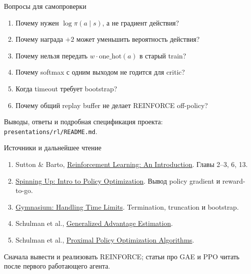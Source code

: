 \documentclass[aspectratio=169]{beamer}
\begin{document}
\begin{frame}{Вопросы для самопроверки}
  \begin{enumerate}
    \item Почему нужен $\log\pi(a\mid s)$, а не градиент действия?
    \item Почему награда $+2$ может уменьшить вероятность действия?
    \item Почему нельзя передать $w\cdot\mathrm{one\_hot}(a)$ в старый train?
    \item Почему softmax с одним выходом не годится для critic?
    \item Когда timeout требует bootstrap?
    \item Почему общий replay buffer не делает REINFORCE off-policy?
  \end{enumerate}
  Выводы, ответы и подробная спецификация проекта:
  \texttt{presentations/rl/README.md}.
\end{frame}

\begin{frame}{Источники и дальнейшее чтение}
  \small
  \begin{enumerate}
    \item Sutton \& Barto,
      \href{http://incompleteideas.net/book/the-book-2nd.html}
      {Reinforcement Learning: An Introduction}.
      Главы 2--3, 6, 13.
    \item \href{https://spinningup.openai.com/en/latest/spinningup/rl_intro3.html}
      {Spinning Up: Intro to Policy Optimization}.
      Вывод policy gradient и reward-to-go.
    \item \href{https://gymnasium.farama.org/main/tutorials/handling_time_limits/}
      {Gymnasium: Handling Time Limits}.
      Termination, truncation и bootstrap.
    \item Schulman et al.,
      \href{https://arxiv.org/abs/1506.02438}{Generalized Advantage Estimation}.
    \item Schulman et al.,
      \href{https://arxiv.org/abs/1707.06347}{Proximal Policy Optimization Algorithms}.
  \end{enumerate}
  Сначала вывести и реализовать REINFORCE; статьи про GAE и PPO
  читать после первого работающего агента.
\end{frame}
\end{document}
